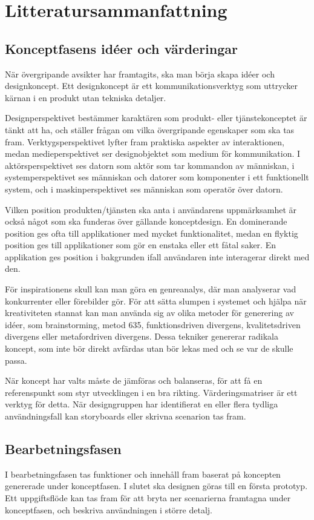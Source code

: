 \documentclass[a4paper,12pt,titlepage]{article}
\begin{document}
\section*{Litteratursammanfattning}
\subsection*{Konceptfasens idéer och värderingar}

När övergripande avsikter har framtagits, ska man börja skapa idéer och
designkoncept. Ett designkoncept är ett kommunikationsverktyg som uttrycker kärnan i en
produkt utan tekniska detaljer. 

Designperspektivet bestämmer karaktären som produkt- eller tjänstekonceptet är tänkt
att ha, och ställer frågan om vilka övergripande egenskaper som ska tas fram.
Verktygsperspektivet lyfter fram praktiska aspekter av interaktionen,
medan medieperspektivet ser designobjektet som medium för kommunikation.
I aktörsperspektivet ses datorn som aktör som tar kommandon av människan, i
systemperspektivet ses människan och datorer som komponenter i ett funktionellt
system, och i maskinperspektivet ses människan som operatör över datorn.

Vilken position produkten/tjänsten ska anta i användarens uppmärksamhet 
är också något som ska funderas över gällande konceptdesign.
En dominerande position ges ofta till applikationer med mycket funktionalitet,
medan en flyktig position ges till applikationer som gör en enstaka eller ett
fåtal saker. En applikation ges position i bakgrunden ifall användaren inte
interagerar direkt med den.

För inspirationens skull kan man göra en genreanalys, där man analyserar vad
konkurrenter eller förebilder gör. För att sätta slumpen i systemet och hjälpa
när kreativiteten stannat kan man
använda sig av olika metoder för generering av idéer, som brainstorming, metod
635, funktionsdriven divergens, kvalitetsdriven divergens eller metafordriven
divergens. Dessa tekniker genererar radikala koncept, som inte bör direkt
avfärdas utan bör lekas med och se var de skulle passa.

När koncept har valts måste de jämföras och balanseras, för att få en referenspunkt som
styr utvecklingen i en bra rikting. Värderingsmatriser är ett verktyg för detta.
När designgruppen har identifierat en eller flera tydliga användningsfall kan storyboards
eller skrivna scenarion tas fram.

\subsection*{Bearbetningsfasen}

I bearbetningsfasen tas funktioner och innehåll fram baserat på koncepten genererade
under konceptfasen. I slutet ska designen göras till en första prototyp. 
Ett uppgiftsflöde kan tas fram för att bryta ner scenarierna framtagna under konceptfasen,
och beskriva användningen i större detalj. 
\end{document}
